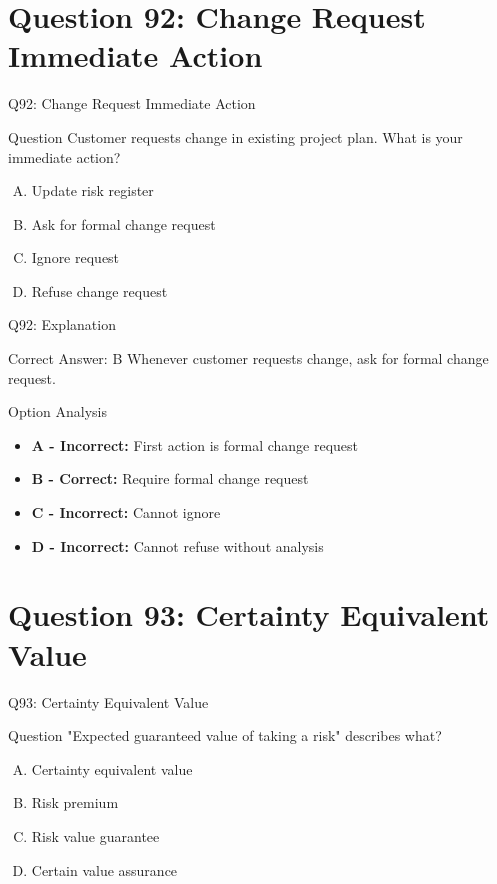 \documentclass{beamer}
\begin{document}
	\section{Question 92: Change Request Immediate Action}
	
	\begin{frame}{Q92: Change Request Immediate Action}
		\begin{block}{Question}
			Customer requests change in existing project plan. What is your immediate action?
		\end{block}
		\begin{enumerate}[(A)]
			\item Update risk register
			\item Ask for formal change request
			\item Ignore request
			\item Refuse change request
		\end{enumerate}
	\end{frame}
	
	\begin{frame}{Q92: Explanation}
		\begin{block}{Correct Answer: B}
			Whenever customer requests change, ask for formal change request.
		\end{block}
		\begin{block}{Option Analysis}
			\begin{itemize}
				\item \textbf{A - Incorrect:} First action is formal change request
				\item \textbf{B - Correct:} Require formal change request
				\item \textbf{C - Incorrect:} Cannot ignore
				\item \textbf{D - Incorrect:} Cannot refuse without analysis
			\end{itemize}
		\end{block}
	\end{frame}
	
	\section{Question 93: Certainty Equivalent Value}
	
	\begin{frame}{Q93: Certainty Equivalent Value}
		\begin{block}{Question}
			"Expected guaranteed value of taking a risk" describes what?
		\end{block}
		\begin{enumerate}[(A)]
			\item Certainty equivalent value
			\item Risk premium
			\item Risk value guarantee
			\item Certain value assurance
		\end{enumerate}
	\end{frame}
	
\end{document}
